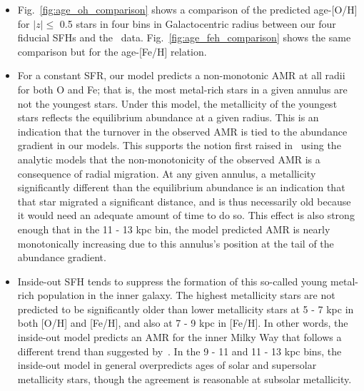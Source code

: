 \documentclass[a4paper, fleqn, usenatbib, useAMS]{mnras}
\begin{document}
\begin{itemize} 
	\item Fig.~\ref{fig:age_oh_comparison} shows a comparison of the 
	predicted age-[O/H] for $\left|z\right|\leq$ 0.5 stars in four bins in 
	Galactocentric radius between our four fiducial SFHs and 
	the~\citet{Feuillet2019} data. Fig.~\ref{fig:age_feh_comparison} shows 
	the same comparison but for the age-[Fe/H] relation. 

	\item For a constant SFR, our model predicts a non-monotonic AMR at all 
	radii for both O and Fe; that is, the most metal-rich stars in a given 
	annulus are not the youngest stars. Under this model, the metallicity 
	of the youngest stars reflects the equilibrium abundance at a given 
	radius. This is an indication that the turnover in the observed AMR is 
	tied to the abundance gradient in our models. This supports the notion 
	first raised in~\citet{Feuillet2018} using the~\citet{Weinberg2017} 
	analytic models that the non-monotonicity of the observed AMR is a 
	consequence of radial migration. At any given annulus, a metallicity 
	significantly different than the equilibrium abundance is an indication 
	that that star migrated a significant distance, and is thus necessarily 
	old because it would need an adequate amount of time to do so. This effect 
	is also strong enough that in the 11 - 13 kpc bin, the model predicted 
	AMR is nearly monotonically increasing due to this annulus's position at 
	the tail of the abundance gradient. 

	\item Inside-out SFH tends to suppress the formation of this so-called 
	young metal-rich population in the inner galaxy. The highest metallicity 
	stars are not predicted to be significantly older than lower metallicity 
	stars at 5 - 7 kpc in both [O/H] and [Fe/H], and also at 7 - 9 kpc in 
	[Fe/H]. In other words, the inside-out model predicts an AMR for the 
	inner Milky Way that follows a different trend than suggested 
	by~\citet{Feuillet2019}. In the 9 - 11 and 11 - 13 kpc bins, the 
	inside-out model in general overpredicts ages of solar and supersolar 
	metallicity stars, though the agreement is reasonable at subsolar 
	metallicity. 


\end{itemize}
\end{document}
